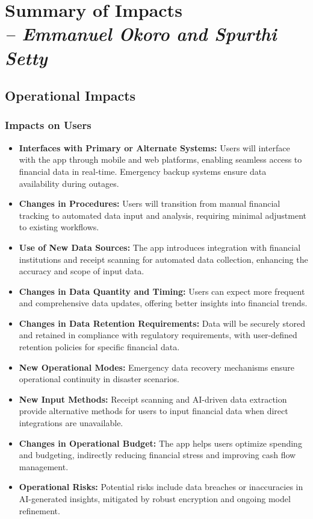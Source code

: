\chapter{Summary of Impacts \\
\small{\textit{-- Emmanuel Okoro and Spurthi Setty}}
\label{Chapter::Summary of Impacts}}

\section{Operational Impacts}

\subsection{Impacts on Users}
\begin{itemize}
    \item \textbf{Interfaces with Primary or Alternate Systems:} Users will interface with the app through mobile and web platforms, enabling seamless access to financial data in real-time. Emergency backup systems ensure data availability during outages.
    \item \textbf{Changes in Procedures:} Users will transition from manual financial tracking to automated data input and analysis, requiring minimal adjustment to existing workflows.
    \item \textbf{Use of New Data Sources:} The app introduces integration with financial institutions and receipt scanning for automated data collection, enhancing the accuracy and scope of input data.
    \item \textbf{Changes in Data Quantity and Timing:} Users can expect more frequent and comprehensive data updates, offering better insights into financial trends.
    \item \textbf{Changes in Data Retention Requirements:} Data will be securely stored and retained in compliance with regulatory requirements, with user-defined retention policies for specific financial data.
    \item \textbf{New Operational Modes:} Emergency data recovery mechanisms ensure operational continuity in disaster scenarios.
    \item \textbf{New Input Methods:} Receipt scanning and AI-driven data extraction provide alternative methods for users to input financial data when direct integrations are unavailable.
    \item \textbf{Changes in Operational Budget:} The app helps users optimize spending and budgeting, indirectly reducing financial stress and improving cash flow management.
    \item \textbf{Operational Risks:} Potential risks include data breaches or inaccuracies in AI-generated insights, mitigated by robust encryption and ongoing model refinement.
\end{itemize}

